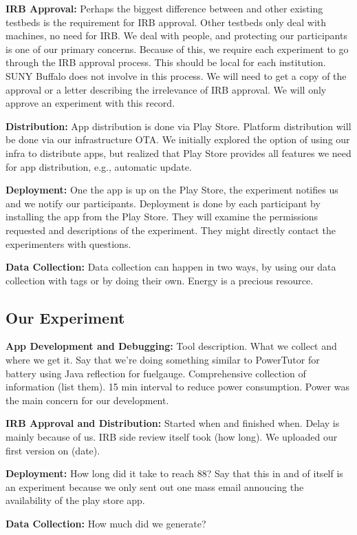 {\bf IRB Approval:} Perhaps the biggest difference between \PhoneLab{} and other
existing testbeds is the requirement for IRB approval. Other testbeds only deal
with machines, no need for IRB. We deal with people, and protecting our
participants is one of our primary concerns. Because of this, we require each
experiment to go through the IRB approval process. This should be local for each
institution. SUNY Buffalo does not involve in this process. We will need to get
a copy of the approval or a letter describing the irrelevance of IRB approval.
We will only approve an experiment with this record.

{\bf Distribution:} App distribution is done via Play Store. Platform
distribution will be done via our infrastructure OTA. We initially explored the
option of using our infra to distribute apps, but realized that Play Store
provides all features we need for app distribution, e.g., automatic update. 

{\bf Deployment:} One the app is up on the Play Store, the experiment notifies
us and we notify our participants. Deployment is done by each participant by
installing the app from the Play Store. They will examine the permissions
requested and descriptions of the experiment. They might directly contact the
experimenters with questions.

{\bf Data Collection:} Data collection can happen in two ways, by using our data
collection with tags or by doing their own. Energy is a precious resource.

\subsection{Our Experiment}

{\bf App Development and Debugging:} Tool description. What we collect and where
we get it. Say that we're doing something similar to PowerTutor for battery
using Java reflection for fuelgauge. Comprehensive collection of information
(list them). 15 min interval to reduce power consumption. Power was the main
concern for our development.

{\bf IRB Approval and Distribution:} Started when and finished when. Delay is
mainly because of us. IRB side review itself took (how long). We uploaded our
first version on (date).

{\bf Deployment:} How long did it take to reach 88? Say that this in and of
itself is an experiment because we only sent out one mass email annoucing the
availability of the play store app.

{\bf Data Collection:} How much did we generate?

